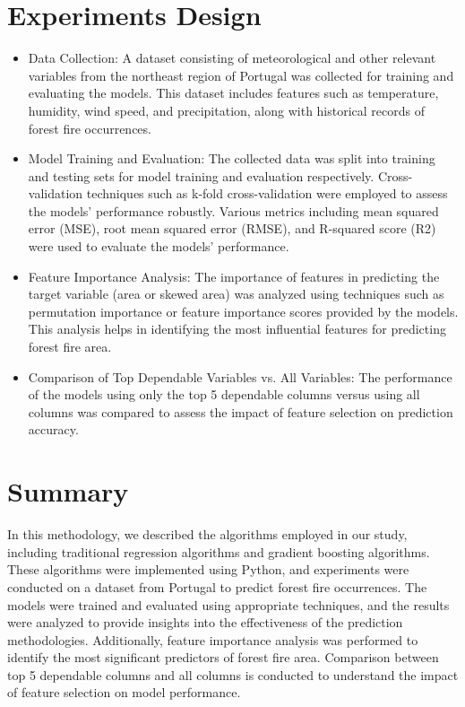 \section {Experiments Design}
\begin{itemize}
\item Data Collection:
A dataset consisting of meteorological and other relevant variables from the northeast region of Portugal was collected for training and evaluating the models. This dataset includes features such as
temperature, humidity, wind speed, and precipitation, along with historical records of forest fire occurrences.

\item Model Training and Evaluation:
The collected data was split into training and testing sets for model training and evaluation respectively. Cross-validation techniques such as k-fold cross-validation were employed to assess
the models' performance robustly. Various metrics including mean squared error (MSE), root mean squared error (RMSE), and R-squared score (R2) were used to evaluate the models' performance.

\item Feature Importance Analysis:
The importance of features in predicting the target variable (area or skewed area) was analyzed using techniques such as permutation importance or feature importance scores provided by the models. This analysis helps in identifying the most influential features for predicting forest fire area.

\item Comparison of Top Dependable Variables vs. All Variables:
The performance of the models using only the top 5 dependable columns versus using all columns was compared to assess the impact of feature selection on prediction accuracy.
\end{itemize}

\section {Summary}
In this methodology, we described the algorithms employed in our study, including traditional regression algorithms and gradient boosting algorithms. These algorithms were implemented using Python, and experiments were conducted on a dataset from Portugal to predict forest fire occurrences. The models were trained and evaluated using appropriate techniques, and the results were analyzed to provide insights into the effectiveness of the prediction methodologies. Additionally, feature importance analysis was performed to identify the most significant predictors of forest fire area. Comparison between top 5 dependable columns and all columns is conducted to understand the impact of feature selection on model performance.